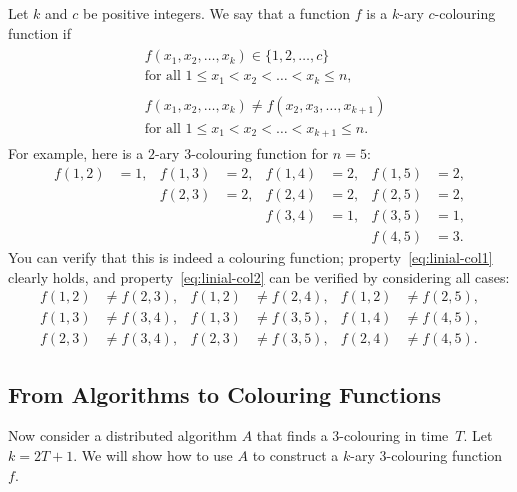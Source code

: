 Let $k$ and $c$ be positive integers. We say that a function $f$ is a $k$-ary $c$-colouring function if
\begin{align}
    \begin{split}
    &f(x_1, x_2, \dotsc, x_k) \in \{1,2,\dotsc,c\} \\
    &\text{for all } 1 \le x_1 < x_2 < \dotso < x_k \le n,
    \end{split}
    \label{eq:linial-col1} \\[3pt]
    \begin{split}
    &f(x_1, x_2, \dotsc, x_k) \ne f(x_2, x_3, \dotsc, x_{k+1}) \\
    &\text{for all } 1 \le x_1 < x_2 < \dotso < x_{k+1} \le n.
    \end{split}
    \label{eq:linial-col2}
\end{align}
For example, here is a $2$-ary $3$-colouring function for $n = 5$:
\begin{align*}
    f(1,2) &= 1, &
    f(1,3) &= 2, &
    f(1,4) &= 2, &
    f(1,5) &= 2, \\&&
    f(2,3) &= 2, &
    f(2,4) &= 2, &
    f(2,5) &= 2, \\&&&&
    f(3,4) &= 1, &
    f(3,5) &= 1, \\&&&&&&
    f(4,5) &= 3.
\end{align*}
You can verify that this is indeed a colouring function; property~\eqref{eq:linial-col1} clearly holds, and property~\eqref{eq:linial-col2} can be verified by considering all cases:
\begin{align*}
    f(1,2) &\ne f(2,3), &
    f(1,2) &\ne f(2,4), &
    f(1,2) &\ne f(2,5), \\
    f(1,3) &\ne f(3,4), &
    f(1,3) &\ne f(3,5), &
    f(1,4) &\ne f(4,5), \\
    f(2,3) &\ne f(3,4), &
    f(2,3) &\ne f(3,5), &
    f(2,4) &\ne f(4,5).
\end{align*}


\subsection{From Algorithms to Colouring Functions}

Now consider a distributed algorithm $A$ that finds a $3$-colouring in time~$T$. Let $k = 2T+1$. We will show how to use $A$ to construct a $k$-ary $3$-colouring function $f$.

